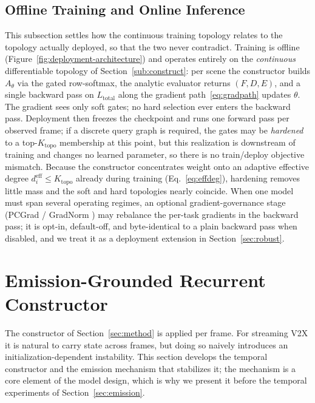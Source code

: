 \documentclass[journal]{IEEEtran}
\newcommand{\Ktopo}{\ensuremath{K_{\mathrm{topo}}}}      %
\begin{document}
\subsection{Offline Training and Online Inference}\label{sub:traininfer}

This subsection settles how the continuous training topology relates to the
topology actually deployed, so that the two never contradict. Training is offline
(Figure~\ref{fig:deployment-architecture}) and operates entirely on the
\emph{continuous} differentiable topology of Section~\ref{sub:construct}: per
scene the constructor builds $A_\theta$ via the gated row-softmax, the analytic
evaluator returns $(F,D,E)$, and a single backward pass on $L_{\mathrm{total}}$
along the gradient path~\eqref{eq:gradpath} updates $\theta$. The gradient sees
only soft gates; no hard selection ever enters the backward pass. Deployment then
freezes the checkpoint and runs one forward pass per observed frame; if a
discrete query graph is required, the gates may be \emph{hardened} to a top-$\Ktopo$
membership at this point, but this realization is downstream of training and
changes no learned parameter, so there is no train/deploy objective mismatch.
Because the constructor concentrates weight onto an adaptive effective degree
$d^{\mathrm{eff}}_i\!\le\!\Ktopo$ already during training (Eq.~\eqref{eq:effdeg}),
hardening removes little mass and the soft and hard topologies nearly coincide. When one model must span
several operating regimes, an optional gradient-governance stage (PCGrad
\cite{PLACEHOLDER_pcgrad} / GradNorm \cite{PLACEHOLDER_gradnorm}) may rebalance
the per-task gradients in the backward pass; it is opt-in, default-off, and
byte-identical to a plain backward pass when disabled, and we treat it as a
deployment extension in Section~\ref{sec:robust}.

\section{Emission-Grounded Recurrent Constructor}\label{sec:emission-constructor}

The constructor of Section~\ref{sec:method} is applied per frame. For streaming
V2X it is natural to carry state across frames, but doing so naively introduces
an initialization-dependent instability. This section develops the temporal
constructor and the emission mechanism that stabilizes it; the mechanism is a
core element of the model design, which is why we present it before the temporal
experiments of Section~\ref{sec:emission}.
\end{document}
